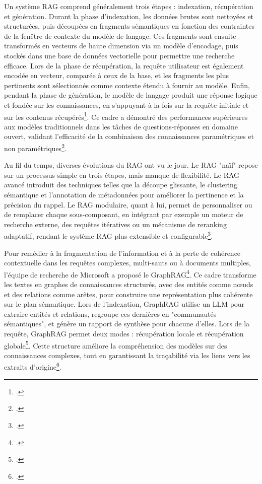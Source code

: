 \documentclass[a4paper,twoside,12pt]{book}
\begin{document}
Un système RAG comprend généralement trois étapes : indexation, récupération et génération. Durant la phase d'indexation, les données brutes sont nettoyées et structurées, puis découpées en fragments sémantiques en fonction des contraintes de la fenêtre de contexte du modèle de langage. Ces fragments sont ensuite transformés en vecteurs de haute dimension via un modèle d'encodage, puis stockés dans une base de données vectorielle pour permettre une recherche efficace. Lors de la phase de récupération, la requête utilisateur est également encodée en vecteur, comparée à ceux de la base, et les fragments les plus pertinents sont sélectionnés comme contexte étendu à fournir au modèle. Enfin, pendant la phase de génération, le modèle de langage produit une réponse logique et fondée sur les connaissances, en s'appuyant à la fois sur la requête initiale et sur les contenus récupérés\footcite{gao2024}. Ce cadre a démontré des performances supérieures aux modèles traditionnels dans les tâches de questions-réponses en domaine ouvert, validant l'efficacité de la combinaison des connaissances paramétriques et non paramétriques\footcite{lewis2021}.

Au fil du temps, diverses évolutions du RAG ont vu le jour. Le RAG "naïf" repose sur un processus simple en trois étapes, mais manque de flexibilité. Le RAG avancé introduit des techniques telles que la découpe glissante, le clustering sémantique et l'annotation de métadonnées pour améliorer la pertinence et la précision du rappel. Le RAG modulaire, quant à lui, permet de personnaliser ou de remplacer chaque sous-composant, en intégrant par exemple un moteur de recherche externe, des requêtes itératives ou un mécanisme de reranking adaptatif, rendant le système RAG plus extensible et configurable\footcite{gao2024}.

Pour remédier à la fragmentation de l'information et à la perte de cohérence contextuelle dans les requêtes complexes, multi-sauts ou à documents multiples, l'équipe de recherche de Microsoft a proposé le GraphRAG\footcite{li2024a}. Ce cadre transforme les textes en graphes de connaissances structurés, avec des entités comme nœuds et des relations comme arêtes, pour construire une représentation plus cohérente sur le plan sémantique. Lors de l'indexation, GraphRAG utilise un LLM pour extraire entités et relations, regroupe ces dernières en "communautés sémantiques", et génère un rapport de synthèse pour chacune d'elles. Lors de la requête, GraphRAG permet deux modes : récupération locale et récupération globale\footcite{whiting2024}. Cette structure améliore la compréhension des modèles sur des connaissances complexes, tout en garantissant la traçabilité via les liens vers les extraits d'origine\footcite{larson2024}.
\end{document}
